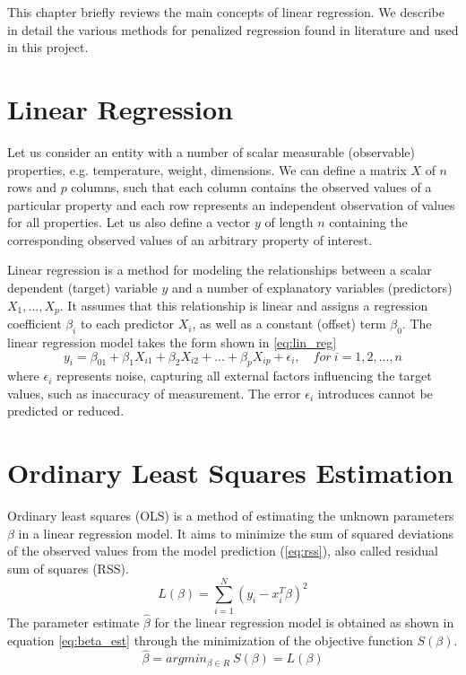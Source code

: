 This chapter briefly reviews the main concepts of linear regression. We describe in detail the various methods for penalized regression found in literature and used in this project.


\section{Linear Regression}
Let us consider an entity with a number of scalar measurable (observable) properties, e.g. temperature, weight, dimensions. We can define a matrix $X$ of $n$ rows and $p$ columns, such that each column contains the observed values of a particular property and each row represents an independent observation of values for all properties. Let us also define a vector $y$ of length $n$ containing the corresponding observed values of an arbitrary property of interest.

Linear regression is a method for modeling the relationships between a scalar dependent (target) variable $y$ and a number of explanatory variables (predictors) $X_1,...,X_p$. It assumes that this relationship is linear and assigns a regression coefficient $\beta_i$ to each predictor $X_i$, as well as a constant (offset) term $\beta_0$. The linear regression model takes the form shown in \ref{eq:lin_reg}
\begin{equation} \label{eq:lin_reg}
y_i = \beta_01+\beta_1X_{i1}+\beta_2X_{i2}+...+\beta_pX_{ip}+\epsilon_i, \quad for\ i=1,2,...,n
\end{equation}
where $\epsilon_i$ represents noise, capturing all external factors influencing the target values, such as inaccuracy of measurement. The error $\epsilon_i$ introduces cannot be predicted or reduced.


\section{Ordinary Least Squares Estimation} \label{sec:olse}
Ordinary least squares (OLS) is a method of estimating the unknown parameters $\beta$ in a linear regression model. It aims to minimize the sum of squared deviations of the observed values from the model prediction (\ref{eq:rss}), also called residual sum of squares (RSS).
\begin{equation} \label{eq:rss}
L(\beta) = \sum_{i=1}^{N} (y_i - x_i^T\beta)^2
\end{equation}
The parameter estimate $\hat{\beta}$ for the linear regression model is obtained as shown in equation \ref{eq:beta_est} through the minimization of the objective function $S(\beta)$.
\begin{equation} \label{eq:beta_est}
\hat{\beta} = argmin_{\beta \in R}\ S(\beta) = L(\beta)
\end{equation}


